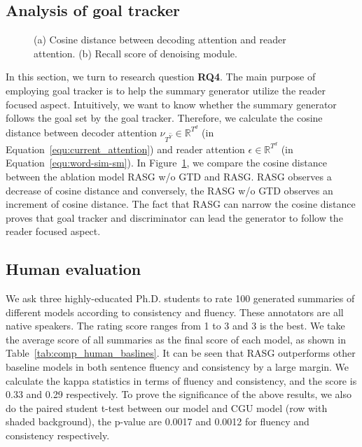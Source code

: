 \documentclass[letterpaper]{article} \usepackage{aaai19}  \usepackage{times}  \usepackage{helvet}  \usepackage{courier}
\begin{document}
\subsection{Analysis of goal tracker}



\begin{figure} 
  \centering 
  \caption{(a) Cosine distance between decoding attention and reader attention. (b) Recall score of denoising module.} 
  \label{fig:subfig} \end{figure}

In this section, we turn to research question \textbf{RQ4}.
The main purpose of employing goal tracker is to help the summary generator utilize the reader focused aspect.
Intuitively, we want to know whether the summary generator follows the goal set by the goal tracker.
Therefore, we calculate the cosine distance between decoder attention $\nu_{T^{\hat{Y}}} \in \mathbb{R}^{T^d}$ (in Equation~\ref{equ:current_attention}) and reader attention $\epsilon \in \mathbb{R}^{T^d}$ (in Equation~\ref{equ:word-sim-sm}).
In Figure~\ref{fig:subfig}, we compare the cosine distance between the ablation model RASG w/o GTD and RASG.
RASG observes a decrease of cosine distance and conversely, the RASG w/o GTD observes an increment of cosine distance.
The fact that RASG can narrow the cosine distance proves that goal tracker and discriminator can lead the generator to follow the reader focused aspect.

\subsection{Human evaluation}

We ask three highly-educated Ph.D. students to rate 100 generated summaries of different models according to consistency and fluency.
These annotators are all native speakers.
The rating score ranges from 1 to 3 and 3 is the best.
We take the average score of all summaries as the final score of each model, as shown in Table~\ref{tab:comp_human_baslines}.
It can be seen that RASG outperforms other baseline models in both sentence fluency and consistency by a large margin.
We calculate the kappa statistics in terms of fluency and consistency, and the score is 0.33 and 0.29 respectively.
To prove the significance of the above results, we also do the paired student t-test between our model and CGU model (row with shaded background), the p-value are 0.0017 and 0.0012 for fluency and consistency respectively.
\end{document}
